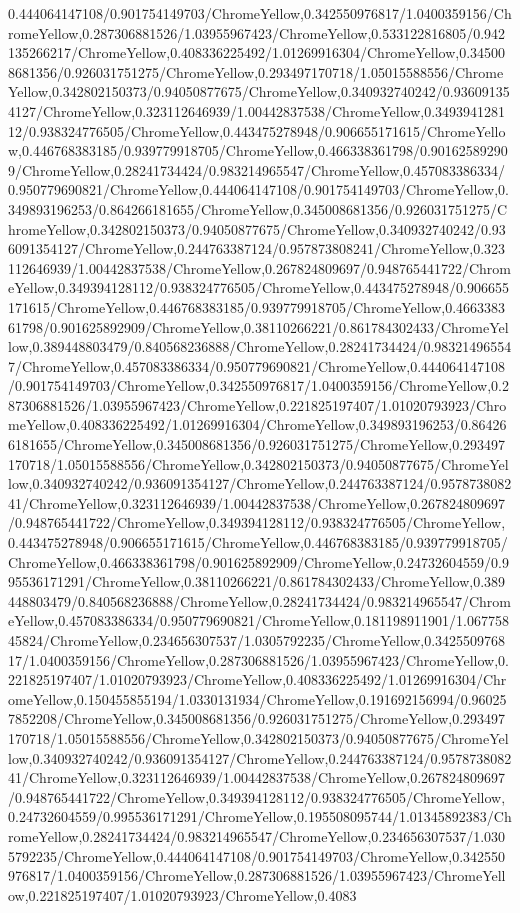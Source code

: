 {\begin{tikzternal}
{0.444064147108/0.901754149703/ChromeYellow,0.342550976817/1.0400359156/ChromeYellow,0.287306881526/1.03955967423/ChromeYellow,0.533122816805/0.942135266217/ChromeYellow,0.408336225492/1.01269916304/ChromeYellow,0.345008681356/0.926031751275/ChromeYellow,0.293497170718/1.05015588556/ChromeYellow,0.342802150373/0.94050877675/ChromeYellow,0.340932740242/0.936091354127/ChromeYellow,0.323112646939/1.00442837538/ChromeYellow,0.349394128112/0.938324776505/ChromeYellow,0.443475278948/0.906655171615/ChromeYellow,0.446768383185/0.939779918705/ChromeYellow,0.466338361798/0.901625892909/ChromeYellow,0.28241734424/0.983214965547/ChromeYellow,0.457083386334/0.950779690821/ChromeYellow,0.444064147108/0.901754149703/ChromeYellow,0.349893196253/0.864266181655/ChromeYellow,0.345008681356/0.926031751275/ChromeYellow,0.342802150373/0.94050877675/ChromeYellow,0.340932740242/0.936091354127/ChromeYellow,0.244763387124/0.957873808241/ChromeYellow,0.323112646939/1.00442837538/ChromeYellow,0.267824809697/0.948765441722/ChromeYellow,0.349394128112/0.938324776505/ChromeYellow,0.443475278948/0.906655171615/ChromeYellow,0.446768383185/0.939779918705/ChromeYellow,0.466338361798/0.901625892909/ChromeYellow,0.38110266221/0.861784302433/ChromeYellow,0.389448803479/0.840568236888/ChromeYellow,0.28241734424/0.983214965547/ChromeYellow,0.457083386334/0.950779690821/ChromeYellow,0.444064147108/0.901754149703/ChromeYellow,0.342550976817/1.0400359156/ChromeYellow,0.287306881526/1.03955967423/ChromeYellow,0.221825197407/1.01020793923/ChromeYellow,0.408336225492/1.01269916304/ChromeYellow,0.349893196253/0.864266181655/ChromeYellow,0.345008681356/0.926031751275/ChromeYellow,0.293497170718/1.05015588556/ChromeYellow,0.342802150373/0.94050877675/ChromeYellow,0.340932740242/0.936091354127/ChromeYellow,0.244763387124/0.957873808241/ChromeYellow,0.323112646939/1.00442837538/ChromeYellow,0.267824809697/0.948765441722/ChromeYellow,0.349394128112/0.938324776505/ChromeYellow,0.443475278948/0.906655171615/ChromeYellow,0.446768383185/0.939779918705/ChromeYellow,0.466338361798/0.901625892909/ChromeYellow,0.24732604559/0.995536171291/ChromeYellow,0.38110266221/0.861784302433/ChromeYellow,0.389448803479/0.840568236888/ChromeYellow,0.28241734424/0.983214965547/ChromeYellow,0.457083386334/0.950779690821/ChromeYellow,0.181198911901/1.06775845824/ChromeYellow,0.234656307537/1.0305792235/ChromeYellow,0.342550976817/1.0400359156/ChromeYellow,0.287306881526/1.03955967423/ChromeYellow,0.221825197407/1.01020793923/ChromeYellow,0.408336225492/1.01269916304/ChromeYellow,0.150455855194/1.0330131934/ChromeYellow,0.191692156994/0.960257852208/ChromeYellow,0.345008681356/0.926031751275/ChromeYellow,0.293497170718/1.05015588556/ChromeYellow,0.342802150373/0.94050877675/ChromeYellow,0.340932740242/0.936091354127/ChromeYellow,0.244763387124/0.957873808241/ChromeYellow,0.323112646939/1.00442837538/ChromeYellow,0.267824809697/0.948765441722/ChromeYellow,0.349394128112/0.938324776505/ChromeYellow,0.24732604559/0.995536171291/ChromeYellow,0.195508095744/1.01345892383/ChromeYellow,0.28241734424/0.983214965547/ChromeYellow,0.234656307537/1.0305792235/ChromeYellow,0.444064147108/0.901754149703/ChromeYellow,0.342550976817/1.0400359156/ChromeYellow,0.287306881526/1.03955967423/ChromeYellow,0.221825197407/1.01020793923/ChromeYellow,0.4083}
\end{tikzternal}}
